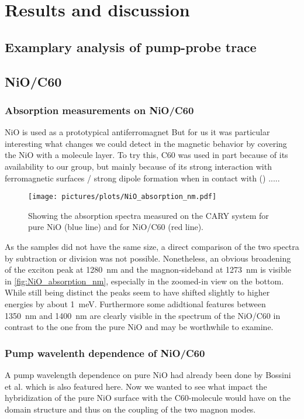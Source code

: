 \chapter{Results and discussion}
\section{Examplary analysis of pump-probe trace}

\section{NiO/C60}
\subsection{Absorption measurements on NiO/C60}
NiO is used as a prototypical antiferromagnet 
But for us it was particular interesting what changes we could detect in the magnetic behavior by covering the NiO with a molecule layer.
To try this, C60 was used in part because of its availability to our group, but mainly because of its strong interaction with ferromagnetic surfaces / strong dipole formation when in contact with () .....
\begin{figure}[ht]
    \centering
    \texttt{[image: pictures/plots/NiO\_absorption\_nm.pdf]}
    \caption{Showing the absorption spectra measured on the CARY system for pure NiO (blue line) and for NiO/C60 (red line).}
    \label{fig:NiO_absorption_nm}
\end{figure}
\FloatBarrier
As the samples did not have the same size, a direct comparison of the two spectra by subtraction or division was not possible.
Nonetheless, an obvious broadening of the exciton peak at \qty{1280}{nm} and the magnon-sideband at \qty{1273}{nm} is visible in \autoref{fig:NiO_absorption_nm}, especially in the zoomed-in view on the bottom.
While still being distinct the peaks seem to have shifted slightly to higher energies by about \qty{1}{meV}.
Furthermore some adidtional features between \qty{1350}{nm} and \qty{1400}{nm} are clearly visible in the spectrum of the NiO/C60 in contrast to the one from the pure NiO and may be worthwhile to examine.

\subsection{Pump wavelenth dependence of NiO/C60}
A pump wavelength dependence on pure NiO had already been done by Bossini et al.  which is also featured here.
Now we wanted to see what impact the hybridization of the pure NiO surface with the C60-molecule would have on the domain structure and thus on the coupling of the two magnon modes.

